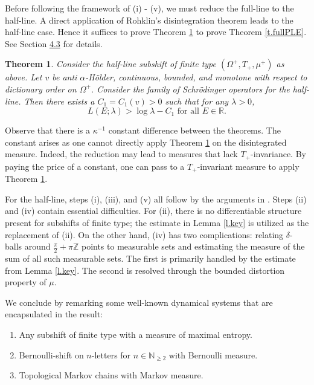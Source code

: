 \documentclass{amsart}
\newtheorem{theorem}{Theorem}
\newcommand{\NN}{\mathbb{N}}
\newcommand{\RR}{\mathbb{R}}
\newcommand{\ZZ}{\mathbb{Z}}
\begin{document}
Before following the framework of (i) - (v), we must reduce the full-line to the half-line. A direct application of Rohklin's disintegration theorem leads to the half-line case. Hence it suffices to prove Theorem \ref{t.halfPLE} to prove Theorem \ref{t.fullPLE}. See Section \hyperlink{fullline}{4.3} for details.

\begin{theorem}\label{t.halfPLE}
    Consider the half-line subshift of finite type $(\Omega^+, T_+, \mu^+)$ as above. Let $v$ be anti $\alpha$-H\"older, continuous, bounded, and monotone with respect to dictionary order on $\Omega^+$. Consider the family of Schr\"odinger operators for the half-line. Then there exists a $C_1 = C_1(v)>0$ such that for any $\lambda> 0$,
    \[L(E;\lambda) > \log\lambda - C_1 \text{ for all } E\in \RR.\]
\end{theorem}

Observe that there is a $\kappa^{-1}$ constant difference between the theorems. The constant arises as one cannot directly apply Theorem \ref{t.halfPLE} on the disintegrated measure. Indeed, the reduction may lead to measures that lack $T_+$-invariance. By paying the price of a constant, one can pass to a $T_+$-invariant measure to apply Theorem \ref{t.halfPLE}.

For the half-line, steps (i), (iii), and (v) all follow by the arguments in \cite{zhenghe2}. Steps (ii) and (iv) contain essential difficulties. For (ii), there is no differentiable structure present for subshifts of finite type; the estimate in Lemma \ref{l.key} is utilized as the replacement of (ii). On the other hand, (iv) has two complications: relating $\delta$-balls around $\frac{\pi}{2} + \pi\ZZ$ points to measurable sets and estimating the measure of the sum of all such measurable sets. The first is primarily handled by the estimate from Lemma \ref{l.key}. The second is resolved through the bounded distortion property of $\mu$.

We conclude by remarking some well-known dynamical systems that are encapsulated in the result:
\begin{enumerate}
    \item Any subshift of finite type with a measure of maximal entropy.
    \item Bernoulli-shift on $n$-letters for $n\in \NN_{\geq 2}$ with Bernoulli measure.
    \item Topological Markov chains with Markov measure.
\end{enumerate}
\end{document}
